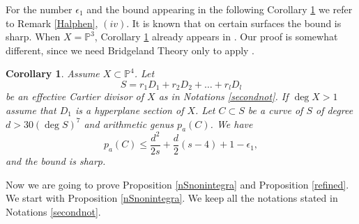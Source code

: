 \documentclass[9pt,a4paper]{amsart}
\theoremstyle{plain}
\newtheorem{corollary}[theorem]{Corollary}
\theoremstyle{definition}
\theoremstyle{remark}
\begin{document}
For the number $\epsilon_1$ and the bound  appearing in the
following Corollary \ref{P3} we refer to Remark \ref{Halphen},
$(iv)$. It is known that on certain surfaces the  bound is sharp. When $X=\mathbb P^3$,
Corollary \ref{P3} already appears in \cite[Proposition 4.3]{Liu}.
Our proof is somewhat different, since we need Bridgeland Theory
only to apply \cite[Lemma 4.1]{Liu}.

\smallskip
\begin{corollary}\label{P3} Assume $X\subset \mathbb P^4$. Let
$$
S=r_1D_1 + r_2D_2 +\dots + r_lD_l
$$
be an effective Cartier divisor of $X$ as in Notations
\ref{secondnot}. If $\deg X>1$ assume that $D_1$ is a hyperplane
section of $X$. Let $C\subset S$ be a curve of $S$ of degree
$d>30(\deg S)^7$ and arithmetic genus $p_a(C)$. We have
$$
p_a(C)\leq \frac{d^2}{2s}+\frac{d}{2}(s-4)+1-\epsilon_1,
$$
and the bound is sharp.
\end{corollary}

\smallskip
Now we are going to prove Proposition \ref{nSnonintegra} and
Proposition \ref{refined}. We start with Proposition
\ref{nSnonintegra}. We keep all the notations stated in Notations
\ref{secondnot}.
\end{document}
